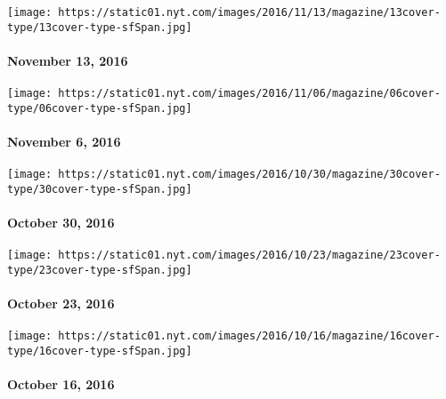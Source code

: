\texttt{[image: https://static01.nyt.com/images/2016/11/13/magazine/13cover-type/13cover-type-sfSpan.jpg]}

\hypertarget{november-13-2016}{%
\paragraph{November 13, 2016}\label{november-13-2016}}

\href{http://www.nytimes.com/indexes/2016/11/06/magazine/index.html}{}

\texttt{[image: https://static01.nyt.com/images/2016/11/06/magazine/06cover-type/06cover-type-sfSpan.jpg]}

\hypertarget{november-6-2016}{%
\paragraph{November 6, 2016}\label{november-6-2016}}

\href{http://www.nytimes.com/indexes/2016/10/30/magazine/index.html}{}

\texttt{[image: https://static01.nyt.com/images/2016/10/30/magazine/30cover-type/30cover-type-sfSpan.jpg]}

\hypertarget{october-30-2016}{%
\paragraph{October 30, 2016}\label{october-30-2016}}

\href{http://www.nytimes.com/indexes/2016/10/23/magazine/index.html}{}

\texttt{[image: https://static01.nyt.com/images/2016/10/23/magazine/23cover-type/23cover-type-sfSpan.jpg]}

\hypertarget{october-23-2016}{%
\paragraph{October 23, 2016}\label{october-23-2016}}

\href{http://www.nytimes.com/indexes/2016/10/16/magazine/index.html}{}

\texttt{[image: https://static01.nyt.com/images/2016/10/16/magazine/16cover-type/16cover-type-sfSpan.jpg]}

\hypertarget{october-16-2016}{%
\paragraph{October 16, 2016}\label{october-16-2016}}

